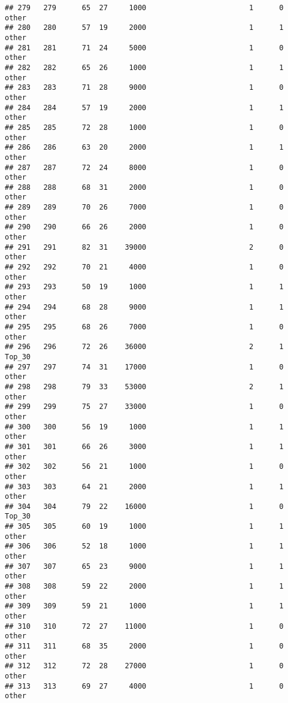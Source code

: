 \documentclass[
]{article}
\begin{document}
\begin{verbatim}
## 279   279      65  27     1000                        1      0    other
## 280   280      57  19     2000                        1      1    other
## 281   281      71  24     5000                        1      0    other
## 282   282      65  26     1000                        1      1    other
## 283   283      71  28     9000                        1      0    other
## 284   284      57  19     2000                        1      1    other
## 285   285      72  28     1000                        1      0    other
## 286   286      63  20     2000                        1      1    other
## 287   287      72  24     8000                        1      0    other
## 288   288      68  31     2000                        1      0    other
## 289   289      70  26     7000                        1      0    other
## 290   290      66  26     2000                        1      0    other
## 291   291      82  31    39000                        2      0    other
## 292   292      70  21     4000                        1      0    other
## 293   293      50  19     1000                        1      1    other
## 294   294      68  28     9000                        1      1    other
## 295   295      68  26     7000                        1      0    other
## 296   296      72  26    36000                        2      1   Top_30
## 297   297      74  31    17000                        1      0    other
## 298   298      79  33    53000                        2      1    other
## 299   299      75  27    33000                        1      0    other
## 300   300      56  19     1000                        1      1    other
## 301   301      66  26     3000                        1      1    other
## 302   302      56  21     1000                        1      0    other
## 303   303      64  21     2000                        1      1    other
## 304   304      79  22    16000                        1      0   Top_30
## 305   305      60  19     1000                        1      1    other
## 306   306      52  18     1000                        1      1    other
## 307   307      65  23     9000                        1      1    other
## 308   308      59  22     2000                        1      1    other
## 309   309      59  21     1000                        1      1    other
## 310   310      72  27    11000                        1      0    other
## 311   311      68  35     2000                        1      0    other
## 312   312      72  28    27000                        1      0    other
## 313   313      69  27     4000                        1      0    other

\end{verbatim}
\end{document}
